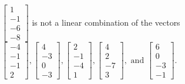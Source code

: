 \begin{exercise}
\begin{exerciseStatement}
  \end{exerciseStatement}
  \begin{exerciseAnswer}
   \(\left[\begin{array}{c}
1 \\
-1 \\
-6 \\
-8
\end{array}\right]\) 
  	 is not  
	a linear combination of the vectors \(\left[\begin{array}{c}
-4 \\
-1 \\
-1 \\
2
\end{array}\right] , \left[\begin{array}{c}
4 \\
-3 \\
0 \\
-3
\end{array}\right] , \left[\begin{array}{c}
2 \\
-1 \\
-4 \\
1
\end{array}\right] , \left[\begin{array}{c}
4 \\
2 \\
-7 \\
3
\end{array}\right] , \text{ and } \left[\begin{array}{c}
6 \\
0 \\
-3 \\
-1
\end{array}\right]\).

	
  


  \end{exerciseAnswer}
\end{exercise}